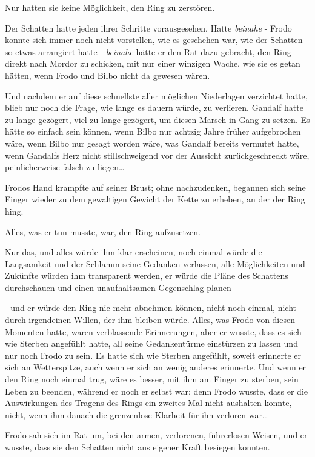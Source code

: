 {Nur hatten sie keine Möglichkeit, den Ring zu zerstören.

Der Schatten hatte jeden ihrer Schritte vorausgesehen. Hatte \emph{beinahe} - Frodo konnte sich immer noch nicht vorstellen, wie es geschehen war, wie der Schatten so etwas arrangiert hatte - \emph{beinahe} hätte er den Rat dazu gebracht, den Ring direkt nach Mordor zu schicken, mit nur einer winzigen Wache, wie sie es getan hätten, wenn Frodo und Bilbo nicht da gewesen wären.

Und nachdem er auf diese schnellste aller möglichen Niederlagen verzichtet hatte, blieb nur noch die Frage, wie lange es dauern würde, zu verlieren. Gandalf hatte zu lange gezögert, viel zu lange gezögert, um diesen Marsch in Gang zu setzen. Es hätte so einfach sein können, wenn Bilbo nur achtzig Jahre früher aufgebrochen wäre, wenn Bilbo nur gesagt worden wäre, was Gandalf bereits vermutet hatte, wenn Gandalfs Herz nicht stillschweigend vor der Aussicht zurückgeschreckt wäre, peinlicherweise falsch zu liegen…

Frodos Hand krampfte auf seiner Brust; ohne nachzudenken, begannen sich seine Finger wieder zu dem gewaltigen Gewicht der Kette zu erheben, an der der Ring hing.

Alles, was er tun musste, war, den Ring aufzusetzen.

Nur das, und alles würde ihm klar erscheinen, noch einmal würde die Langsamkeit und der Schlamm seine Gedanken verlassen, alle Möglichkeiten und Zukünfte würden ihm transparent werden, er würde die Pläne des Schattens durchschauen und einen unaufhaltsamen Gegenschlag planen -

- und er würde den Ring nie mehr abnehmen können, nicht noch einmal, nicht durch irgendeinen Willen, der ihm bleiben würde. Alles, was Frodo von diesen Momenten hatte, waren verblassende Erinnerungen, aber er wusste, dass es sich wie Sterben angefühlt hatte, all seine Gedankentürme einstürzen zu lassen und nur noch Frodo zu sein. Es hatte sich wie Sterben angefühlt, soweit erinnerte er sich an Wetterspitze, auch wenn er sich an wenig anderes erinnerte. Und wenn er den Ring noch einmal trug, wäre es besser, mit ihm am Finger zu sterben, sein Leben zu beenden, während er noch er selbst war; denn Frodo wusste, dass er die Auswirkungen des Tragens des Rings ein zweites Mal nicht aushalten konnte, nicht, wenn ihm danach die grenzenlose Klarheit für ihn verloren war…

Frodo sah sich im Rat um, bei den armen, verlorenen, führerlosen Weisen, und er wusste, dass sie den Schatten nicht aus eigener Kraft besiegen konnten.

}

